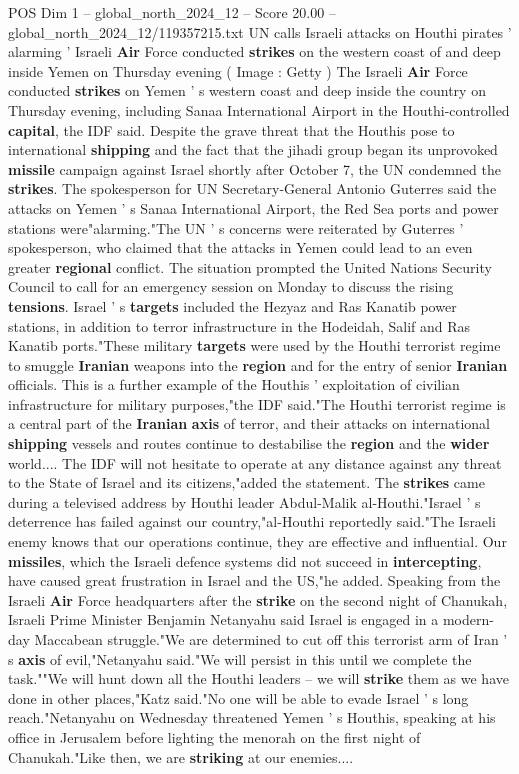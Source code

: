 \begin{textsample}{POS Dim 1 – global\_north\_2024\_12 – Score 20.00 – global\_north\_2024\_12/119357215.txt}  \label{ex:f1_pos_266}
UN calls Israeli attacks on Houthi pirates ' alarming ' Israeli \textbf{Air} Force conducted \textbf{strikes} on the western coast of and deep inside Yemen on Thursday evening ( Image : Getty ) The Israeli \textbf{Air} Force conducted \textbf{strikes} on Yemen ' s western coast and deep inside the country on Thursday evening, including Sanaa International Airport in the Houthi-controlled \textbf{capital}, the IDF said.
Despite the grave threat that the Houthis pose to international \textbf{shipping} and the fact that the jihadi group began its unprovoked \textbf{missile} campaign against Israel shortly after October 7, the UN condemned the \textbf{strikes}.
The spokesperson for UN Secretary-General Antonio Guterres said the attacks on Yemen ' s Sanaa International Airport, the Red Sea ports and power stations were"alarming."The UN ' s concerns were reiterated by Guterres ' spokesperson, who claimed that the attacks in Yemen could lead to an even greater \textbf{regional} conflict.
The situation prompted the United Nations Security Council to call for an emergency session on Monday to discuss the rising \textbf{tensions}.
Israel ' s \textbf{targets} included the Hezyaz and Ras Kanatib power stations, in addition to terror infrastructure in the Hodeidah, Salif and Ras Kanatib ports."These military \textbf{targets} were used by the Houthi terrorist regime to smuggle \textbf{Iranian} weapons into the \textbf{region} and for the entry of senior \textbf{Iranian} officials.
This is a further example of the Houthis ' exploitation of civilian infrastructure for military purposes,"the IDF said."The Houthi terrorist regime is a central part of the \textbf{Iranian} \textbf{axis} of terror, and their attacks on international \textbf{shipping} vessels and routes continue to destabilise the \textbf{region} and the \textbf{wider} world....
The IDF will not hesitate to operate at any distance against any threat to the State of Israel and its citizens,"added the statement.
The \textbf{strikes} came during a televised address by Houthi leader Abdul-Malik al-Houthi."Israel ' s deterrence has failed against our country,"al-Houthi reportedly said."The Israeli enemy knows that our operations continue, they are effective and influential.
Our \textbf{missiles}, which the Israeli defence systems did not succeed in \textbf{intercepting}, have caused great frustration in Israel and the US,"he added.
Speaking from the Israeli \textbf{Air} Force headquarters after the \textbf{strike} on the second night of Chanukah, Israeli Prime Minister Benjamin Netanyahu said Israel is engaged in a modern-day Maccabean struggle."We are determined to cut off this terrorist arm of Iran ' s \textbf{axis} of evil,"Netanyahu said."We will persist in this until we complete the task.""We will hunt down all the Houthi leaders -- we will \textbf{strike} them as we have done in other places,"Katz said."No one will be able to evade Israel ' s long reach."Netanyahu on Wednesday threatened Yemen ' s Houthis, speaking at his office in Jerusalem before lighting the menorah on the first night of Chanukah."Like then, we are \textbf{striking} at our enemies....

\end{textsample}
